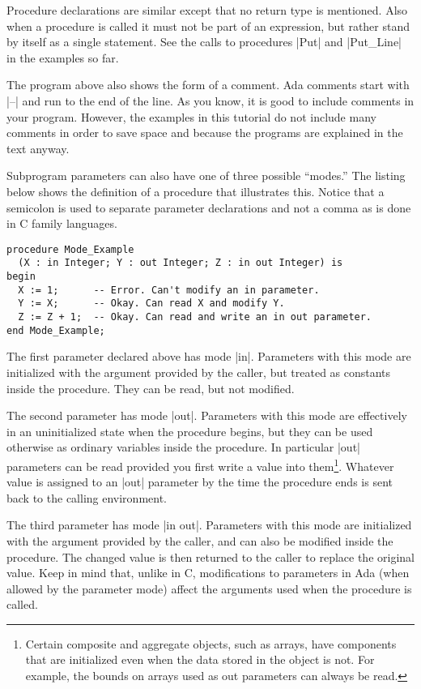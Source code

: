 Procedure declarations are similar except that no return type is mentioned. Also when a
procedure is called it must not be part of an expression, but rather stand by itself as a single
statement. See the calls to procedures |Put| and |Put_Line| in the examples so far.

The program above also shows the form of a comment. Ada comments start with |--| and run to the
end of the line. As you know, it is good to include comments in your program. However, the
examples in this tutorial do not include many comments in order to save space and because the
programs are explained in the text anyway.

Subprogram parameters can also have one of three possible ``modes.'' The listing below shows the
definition of a procedure that illustrates this. Notice that a semicolon is used to separate
parameter declarations and not a comma as is done in C family languages.

\begin{lstlisting}
procedure Mode_Example
  (X : in Integer; Y : out Integer; Z : in out Integer) is
begin
  X := 1;      -- Error. Can't modify an in parameter.
  Y := X;      -- Okay. Can read X and modify Y.
  Z := Z + 1;  -- Okay. Can read and write an in out parameter.
end Mode_Example;
\end{lstlisting}

The first parameter declared above has mode |in|. Parameters with this mode are initialized with
the argument provided by the caller, but treated as constants inside the procedure. They can be
read, but not modified.

The second parameter has mode |out|. Parameters with this mode are effectively in an
uninitialized state when the procedure begins, but they can be used otherwise as ordinary
variables inside the procedure. In particular |out| parameters can be read provided you first
write a value into them\footnote{Certain composite and aggregate objects, such as arrays, have
  components that are initialized even when the data stored in the object is not. For example,
  the bounds on arrays used as out parameters can always be read.}. Whatever value is assigned
to an |out| parameter by the time the procedure ends is sent back to the calling environment.

The third parameter has mode |in out|. Parameters with this mode are initialized with the
argument provided by the caller, and can also be modified inside the procedure. The changed
value is then returned to the caller to replace the original value. Keep in mind that, unlike in
C, modifications to parameters in Ada (when allowed by the parameter mode) affect the arguments
used when the procedure is called.

